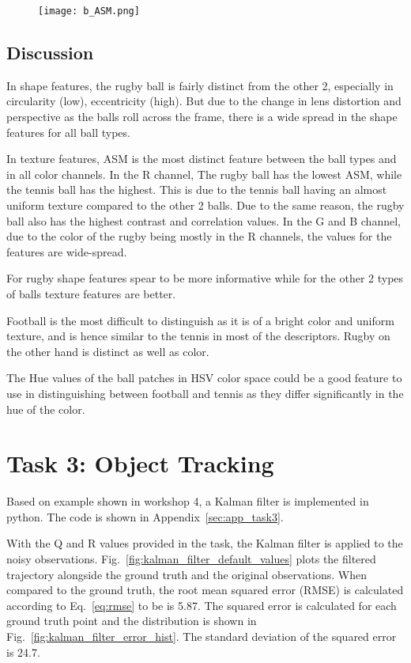 \documentclass{report}
\begin{document}
\begin{figure}[ht]
    \centering
    \texttt{[image: b\_ASM.png]}
    \label{fib:g_ASM}
\end{figure}

\section{Discussion}

In shape features, the rugby ball is fairly distinct from the other 2, especially in circularity (low), eccentricity (high). But due to the change in lens distortion and perspective as the balls roll across the frame, there is a wide spread in the shape features for all ball types.

In texture features, ASM is the most distinct feature between the ball types and in all color channels. In the R channel, The rugby ball has the lowest ASM, while the tennis ball has the highest. This is due to the tennis ball having an almost uniform texture compared to the other 2 balls. Due to the same reason, the rugby ball also has the highest contrast and correlation values. In the G and B channel, due to the color of the rugby being mostly in the R channels, the values for the features are wide-spread.

For rugby shape features spear to be more informative while for the other 2 types of balls texture features are better.

Football is the most difficult to distinguish as it is of a bright color and uniform texture, and is hence similar to the tennis in most of the descriptors. Rugby on the other hand is distinct as well as color.

The Hue values of the ball patches in HSV color space could be a good feature to use in distinguishing between football and tennis as they differ significantly in the hue of the color.

\chapter{Task 3: Object Tracking}

Based on example shown in workshop 4, a Kalman filter is implemented in python. The code is shown in Appendix~\ref{sec:app_task3}.

With the Q and R values provided in the task, the Kalman filter is applied to the noisy observations. Fig.~\ref{fig:kalman_filter_default_values} plots the filtered trajectory alongside the ground truth and the original observations. When compared to the ground truth, the root mean squared error (RMSE) is calculated according to Eq.~\ref{eq:rmse} to be is 5.87. The squared error is calculated for each ground truth point and the distribution is shown in Fig.~\ref{fig:kalman_filter_error_hist}. The standard deviation of the squared error is 24.7.
\end{document}
